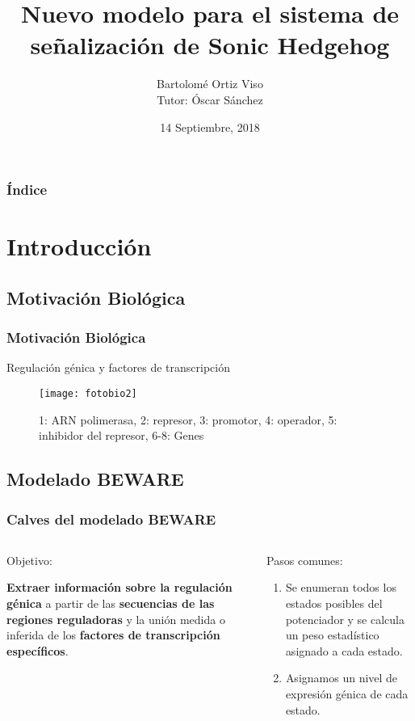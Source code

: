 \documentclass{beamer}
\title[Sonic Hedgehog signaling system]{
  Nuevo modelo para el sistema de señalización de Sonic Hedgehog}
\subtitle{}
\author[Bartolomé Ortiz Viso]{
  Bartolomé Ortiz Viso \\\medskip
  {\small Tutor: Óscar Sánchez} }
\institute[Universidad de Granada]{
  Trabajo Fin de Máster  \\
  Máster en Física y Matemáticas}
\date[14 Septiembre, 2018]{
  14 Septiembre, 2018}
\begin{document}
\begin{frame}
  \titlepage
\end{frame}

\begin{frame}
  \frametitle{Índice}
  \tableofcontents
\end{frame}

\section{Introducción}

\subsection{Motivación Biológica}
\begin{frame}
  \frametitle{Motivación Biológica}
\begin{center}
	Regulación génica y factores de transcripción
	
	\begin{figure}[h]
		\texttt{[image: fotobio2]}
		\centering
		\caption{\small{1: ARN polimerasa, 2: represor, 3: promotor, 4: operador, 5: inhibidor del represor, 6-8: Genes}}
	\end{figure} 
\end{center}
\end{frame}

\subsection{Modelado BEWARE}
\begin{frame}
\frametitle{Calves del modelado BEWARE}
\begin{columns}
	\begin{column}{0.5\textwidth}
		{Objetivo:}
		
		\textbf{Extraer información sobre la regulación génica} a partir de las \textbf{secuencias de las regiones reguladoras} y la unión medida o inferida de los\textbf{ factores de transcripción específicos}.
		
	\end{column}
	\begin{column}{0.5\textwidth}
		 {Pasos comunes:}
		
		\begin{enumerate}
			\item  Se enumeran todos los estados posibles del potenciador y se calcula un peso estadístico asignado a cada estado.
			\item Asignamos un nivel de expresión génica de cada estado.
		\end{enumerate}
	\end{column}
\end{columns}


\end{frame}
\end{document}
